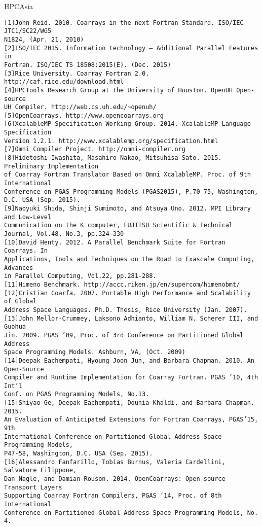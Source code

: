 \documentclass[graybox]{svmult}
\begin{document}
HPCAsia
\begin{verbatim}
[1]John Reid. 2010. Coarrays in the next Fortran Standard. ISO/IEC JTC1/SC22/WG5 
N1824, (Apr. 21, 2010)
[2]ISO/IEC 2015. Information technology – Additional Parallel Features in 
Fortran. ISO/IEC TS 18508:2015(E). (Dec. 2015)
[3]Rice University. Coarray Fortran 2.0. http://caf.rice.edu/download.html
[4]HPCTools Research Group at the University of Houston. OpenUH Open-source 
UH Compiler. http://web.cs.uh.edu/~openuh/
[5]OpenCoarrays. http://www.opencoarrays.org
[6]XcalableMP Specification Working Group. 2014. XcalableMP Language Specification 
Version 1.2.1. http://www.xcalablemp.org/specification.html
[7]Omni Compiler Project. http://omni-compiler.org
[8]Hidetoshi Iwashita, Masahiro Nakao, Mitsuhisa Sato. 2015. Preliminary Implementation 
of Coarray Fortran Translator Based on Omni XcalableMP. Proc. of 9th International 
Conference on PGAS Programming Models (PGAS2015), P.70-75, Washington, D.C. USA (Sep. 2015).
[9]Naoyuki Shida, Shinji Sumimoto, and Atsuya Uno. 2012. MPI Library and Low-Level 
Communication on the K computer, FUJITSU Scientific & Technical Journal, Vol.48, No.3, pp.324–330
[10]David Henty. 2012. A Parallel Benchmark Suite for Fortran Coarrays. In 
Applications, Tools and Techniques on the Road to Exascale Computing, Advances 
in Parallel Computing, Vol.22, pp.281-288.
[11]Himeno Benchmark. http://accc.riken.jp/en/supercom/himenobmt/
[12]Cristian Coarfa. 2007. Portable High Performance and Scalability of Global 
Address Space Languages. Ph.D. Thesis, Rice University (Jan. 2007).
[13]John Mellor-Crummey, Laksono Adhianto, William N. Scherer III, and Guohua 
Jin. 2009. PGAS ’09, Proc. of 3rd Conference on Partitioned Global Address 
Space Programming Models. Ashburn, VA, (Oct. 2009)
[14]Deepak Eachempati, Hyoung Joon Jun, and Barbara Chapman. 2010. An Open-Source 
Compiler and Runtime Implementation for Coarray Fortran. PGAS ’10, 4th Int’l 
Conf. on PGAS Programming Models, No.13.
[15]Shiyao Ge, Deepak Eachempati, Dounia Khaldi, and Barbara Chapman. 2015. 
An Evaluation of Anticipated Extensions for Fortran Coarrays, PGAS’15, 9th 
International Conference on Partitioned Global Address Space Programming Models, 
P47-58, Washington, D.C. USA (Sep. 2015).
[16]Alessandro Fanfarillo, Tobias Burnus, Valeria Cardellini, Salvatore Filippone, 
Dan Nagle, and Damian Rouson. 2014. OpenCoarrays: Open-source Transport Layers 
Supporting Coarray Fortran Compilers, PGAS ’14, Proc. of 8th International 
Conference on Partitioned Global Address Space Programming Models, No. 4.
\end{verbatim}
\end{document}
